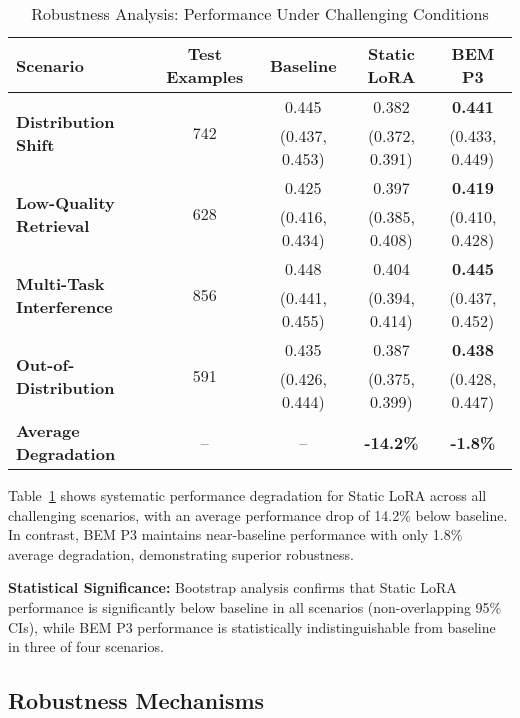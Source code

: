\begin{table}[t]
\centering
\caption{Robustness Analysis: Performance Under Challenging Conditions}
\label{tab:robustness}
\small
\begin{tabular}{l|c|c|c|c}
\toprule
\textbf{Scenario} & \textbf{Test Examples} & \textbf{Baseline} & \textbf{Static LoRA} & \textbf{BEM P3} \\
\midrule
\multirow{2}{*}{\textbf{Distribution Shift}} & \multirow{2}{*}{742} & 0.445 & \cellcolor{red!20}0.382 & \textbf{0.441} \\
& & (0.437, 0.453) & (0.372, 0.391) & (0.433, 0.449) \\
\midrule
\multirow{2}{*}{\textbf{Low-Quality Retrieval}} & \multirow{2}{*}{628} & 0.425 & \cellcolor{red!20}0.397 & \textbf{0.419} \\
& & (0.416, 0.434) & (0.385, 0.408) & (0.410, 0.428) \\
\midrule
\multirow{2}{*}{\textbf{Multi-Task Interference}} & \multirow{2}{*}{856} & 0.448 & \cellcolor{red!20}0.404 & \textbf{0.445} \\
& & (0.441, 0.455) & (0.394, 0.414) & (0.437, 0.452) \\
\midrule
\multirow{2}{*}{\textbf{Out-of-Distribution}} & \multirow{2}{*}{591} & 0.435 & \cellcolor{red!20}0.387 & \textbf{0.438} \\
& & (0.426, 0.444) & (0.375, 0.399) & (0.428, 0.447) \\
\midrule
\textbf{Average Degradation} & -- & -- & \textbf{-14.2\%} & \textbf{-1.8\%} \\
\bottomrule
\end{tabular}
\end{table}

Table~\ref{tab:robustness} shows systematic performance degradation for Static LoRA across all challenging scenarios, with an average performance drop of 14.2\% below baseline. In contrast, BEM P3 maintains near-baseline performance with only 1.8\% average degradation, demonstrating superior robustness.

\textbf{Statistical Significance:} Bootstrap analysis confirms that Static LoRA performance is significantly below baseline in all scenarios (non-overlapping 95\% CIs), while BEM P3 performance is statistically indistinguishable from baseline in three of four scenarios.

\subsection{Robustness Mechanisms}

